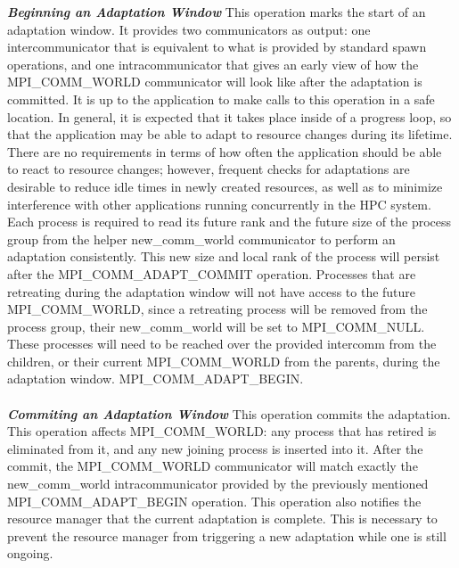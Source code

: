 \textbf{\textit{Beginning an Adaptation Window}} This operation marks the start of an adaptation window. It provides two communicators as output: one intercommunicator that is equivalent to what is provided by standard spawn operations, and one intracommunicator that gives an early view of how the MPI{\_}COMM{\_}WORLD communicator will look like after the adaptation is committed. It is up to the application to make calls to this operation in a safe location. In general, it is expected that it takes place inside of a progress loop, so that the application may be able to adapt to resource changes during its lifetime. There are no requirements in terms of how often the application should be able to react to resource changes; however, frequent checks for adaptations are desirable to reduce idle times in newly created resources, as well as to minimize interference with other applications running concurrently in the HPC system. Each process is required to read its future rank and the future  size of the process group from the helper new{\_}comm{\_}world communicator to perform an adaptation consistently. This new size and local rank of the process will persist after the MPI{\_}COMM{\_}ADAPT{\_}COMMIT operation. Processes that are retreating during the adaptation window will not have access to the future MPI{\_}COMM{\_}WORLD, since a retreating process will be removed from the process group, their new{\_}comm{\_}world will be set to MPI{\_}COMM{\_}NULL. These processes will need to be reached over the provided intercomm from the children, or their current MPI{\_}COMM{\_}WORLD from the parents, during the adaptation window. MPI{\_}COMM{\_}ADAPT{\_}BEGIN.\\ \\
\textbf{\textit{Commiting an Adaptation Window}} This operation commits the adaptation. This operation affects MPI{\_}COMM{\_}WORLD: any process that has retired is eliminated from it, and any new joining process is inserted into it. After the commit, the MPI{\_}COMM{\_}WORLD communicator will match exactly the new{\_}comm{\_}world intracommunicator provided by the previously mentioned MPI{\_}COMM{\_}ADAPT{\_}BEGIN operation. This operation also notifies the resource manager that the current adaptation is complete. This is necessary to prevent the resource manager from triggering a new adaptation while one is still ongoing.
